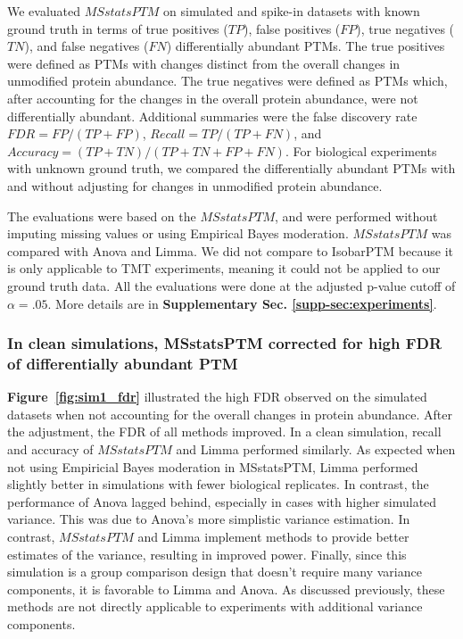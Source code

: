 \documentclass[mcp]{article}
\numberwithin{table}{section}
\def\figref#1{{\bf Figure~\ref{fig:#1}}}
\begin{document}
We evaluated $MSstatsPTM$ on simulated and spike-in datasets with known ground truth in terms of true positives ($TP$), false positives ($FP$), true negatives ($TN$), and false negatives ($FN$) differentially abundant PTMs. The true positives were defined as PTMs with changes distinct from the overall changes in unmodified protein abundance. The true negatives were defined as PTMs which, after accounting for the changes in the overall protein abundance, were not differentially abundant. Additional summaries were the false discovery rate $FDR=FP/(TP+FP)$, $Recall=TP/(TP + FN)$, and $Accuracy=(TP + TN) / (TP + TN + FP + FN)$.
For biological experiments with unknown ground truth, we compared the differentially abundant PTMs with and without adjusting for changes in unmodified protein abundance. 

The evaluations were based on the $MSstatsPTM$, and were performed without imputing missing values or using Empirical Bayes moderation. $MSstatsPTM$ was compared with Anova and Limma. We did not compare to IsobarPTM because it is only applicable to TMT experiments, meaning it could not be applied to our ground truth data. All the evaluations were done at the adjusted p-value cutoff of $\alpha=.05$. More details are in {\bf Supplementary Sec. \ref{supp-sec:experiments}}. 

\subsubsection*{In clean simulations, MSstatsPTM corrected for high FDR of differentially abundant PTM}

\figref{sim1_fdr} illustrated the high FDR observed on the simulated datasets when not accounting for the overall changes in protein abundance. After the adjustment, the FDR of all methods improved. In a clean simulation, recall and accuracy of $MSstatsPTM$ and Limma performed similarly. As expected when not using Empiricial Bayes moderation in MSstatsPTM, Limma performed slightly better in simulations with fewer biological replicates. In contrast, the performance of Anova lagged behind, especially in cases with higher simulated variance. This was due to Anova's more simplistic variance estimation. In contrast, $MSstatsPTM$ and Limma implement methods to provide better estimates of the variance, resulting in improved power. Finally, since this simulation is a group comparison design that doesn't require many variance components, it is favorable to Limma and Anova. As discussed previously, these methods are not directly applicable to experiments with additional variance components.
\end{document}
